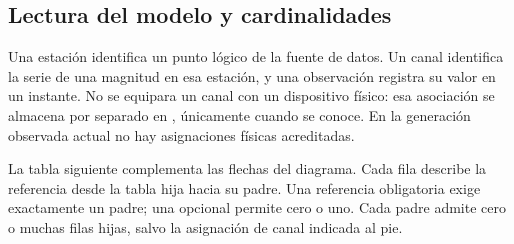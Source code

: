 \subsection{Lectura del modelo y cardinalidades}
Una estación identifica un punto lógico de la fuente de datos. Un canal identifica
la serie de una magnitud en esa estación, y una observación registra su valor en
un instante. No se equipara un canal con un dispositivo físico: esa asociación
se almacena por separado en , únicamente cuando se conoce.
En la generación observada actual no hay asignaciones físicas acreditadas.

La tabla siguiente complementa las flechas del diagrama. Cada fila describe la
referencia desde la tabla hija hacia su padre. Una referencia obligatoria exige
exactamente un padre; una opcional permite cero o uno. Cada padre admite cero o
muchas filas hijas, salvo la asignación de canal indicada al pie.

